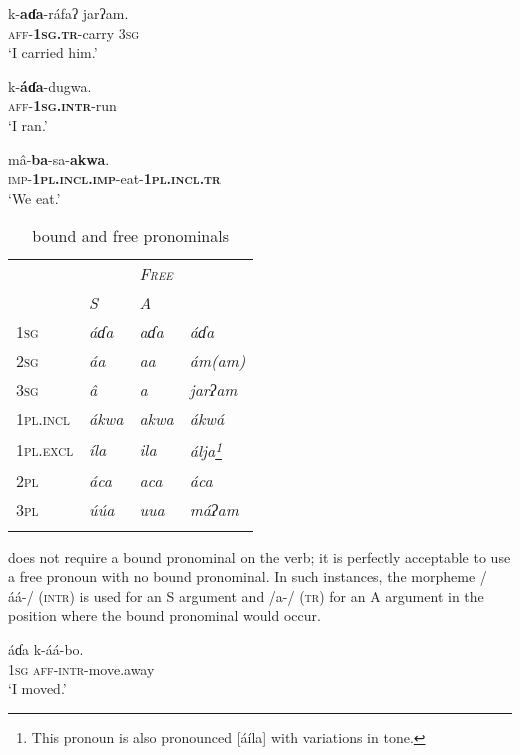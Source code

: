 \documentclass[output=paper]{langsci/langscibook}
\begin{document}
\ea\label{ex:ahlandc:16}
\gll
k-\textbf{aɗa}{}-ráfaʔ   jarʔam. \\ 
\textsc{aff-}\textbf{\textsc{1sg.tr}}{}-carry  \textsc{3sg} \\
\glt
‘I carried him.’
\z

\ea\label{ex:ahlandc:17}
\gll
k-\textbf{áɗa}{}-dugwa. \\
\textsc{aff-\textbf{1sg.intr}}-run   \\
\glt
‘I ran.’
\z

\ea\label{ex:ahlandc:18}
\gll
m\^{a}-\textbf{ba}{}-sa-\textbf{akwa}. \\
\textsc{imp-}\textbf{\textsc{1pl.incl.imp}}{}-eat-\textbf{\textsc{1pl.incl.tr}} \\
\glt
‘We eat.’
\z


\begin{table}
\begin{tabularx}{\textwidth}{X>{\itshape}X>{\itshape}X>{\itshape}X}
\lsptoprule 
& \multicolumn{2}{X}{\scshape Bound} & \scshape \textup{Free}\\
& \textup{S} & \textup{A} & \\
\midrule
\scshape 1sg & áɗa & aɗa & áɗa\\
\scshape 2sg & áa &  aa &  ám(am)\\
\scshape 3sg &  â & a &  jarʔam\\
\scshape 1pl.incl &  ákwa &  akwa &  ákwá\\
\scshape 1pl.excl & íla &  ila &  álja\footnote{This pronoun is also pronounced [áíla] with variations in tone.} \\
\scshape 2pl & áca &  aca & áca\\
\scshape 3pl & \'{u}\'{u}a & uua &  máʔam\\
\lspbottomrule
\end{tabularx}
\caption{ bound and free pronominals}
\label{tab:ahlandc:4}
\end{table}

 does not require a bound pronominal on the verb; it is perfectly acceptable to use a free pronoun with no bound pronominal. In such instances, the morpheme /áá-/ (\textsc{intr}) is used for an S argument  and /a-/ (\textsc{tr}) for an A argument  in the position where the bound pronominal would occur.  

\ea\label{ex:ahlandc:19}
\gll
áɗa   k-áá-bo. \\
1\textsc{sg}    \textsc{aff-intr-}move.away \\
\glt
‘I moved.’
\z
\end{document}
